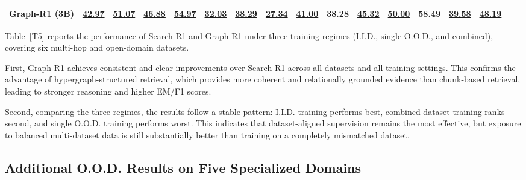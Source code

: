 \documentclass{article}
\theoremstyle{plain}
\theoremstyle{definition}
\theoremstyle{remark}
\begin{document}
\begin{table}[h]
{\begin{tabular}{l cc cc cc cc cc cc cc}
\rowcolor{Graph-R1!15} Graph-R1 (3B) & \underline{42.97} & \underline{51.07} & \underline{46.88} & \underline{54.97} & \underline{32.03} & \underline{38.29} & \underline{27.34} & \underline{41.00} & \textbf{38.28} & \underline{45.32} & \underline{50.00} & 58.49 & \underline{39.58} & \underline{48.19} \\
\bottomrule
\end{tabular}
}
\end{table}

Table~\ref{T5} reports the performance of Search-R1 and Graph-R1 under three training regimes (I.I.D., single O.O.D., and combined), covering six multi-hop and open-domain datasets.

First, Graph-R1 achieves consistent and clear improvements over Search-R1 across all datasets and all training settings. This confirms the advantage of hypergraph-structured retrieval, which provides more coherent and relationally grounded evidence than chunk-based retrieval, leading to stronger reasoning and higher EM/F1 scores.

Second, comparing the three regimes, the results follow a stable pattern: I.I.D. training performs best, combined-dataset training ranks second, and single O.O.D. training performs worst. This indicates that dataset-aligned supervision remains the most effective, but exposure to balanced multi-dataset data is still substantially better than training on a completely mismatched dataset.

\subsection{Additional O.O.D. Results on Five Specialized Domains}
\end{document}

